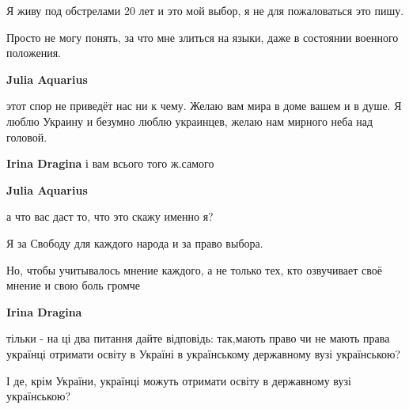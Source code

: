 \begin{itemize}
\begin{itemize}
Я живу под обстрелами 20 лет и это мой выбор, я не для пожаловаться это пишу.

Просто не могу понять, за что мне злиться на языки, даже в состоянии военного
положения.


 
\textbf{Julia Aquarius} 

этот спор не приведёт нас ни к чему. Желаю вам мира в доме вашем и в душе. Я
люблю Украину и безумно люблю украинцев, желаю нам мирного неба над головой.

 
\textbf{Irina Dragina} і вам всього того ж.самого

 
\textbf{Julia Aquarius} 

а что вас даст то, что это скажу именно я?

Я за Свободу для каждого народа и за право выбора.

Но, чтобы учитывалось мнение каждого, а не только тех, кто озвучивает своё
мнение и свою боль громче


 
\textbf{Irina Dragina} 

тільки - на ці два питання дайте відповідь: так,мають право чи не мають права
українці отримати освіту в Україні в українському державному вузі українською? 

І де, крім України, українці можуть отримати освіту в державному вузі
українською?

 

\end{itemize}
\end{itemize}
